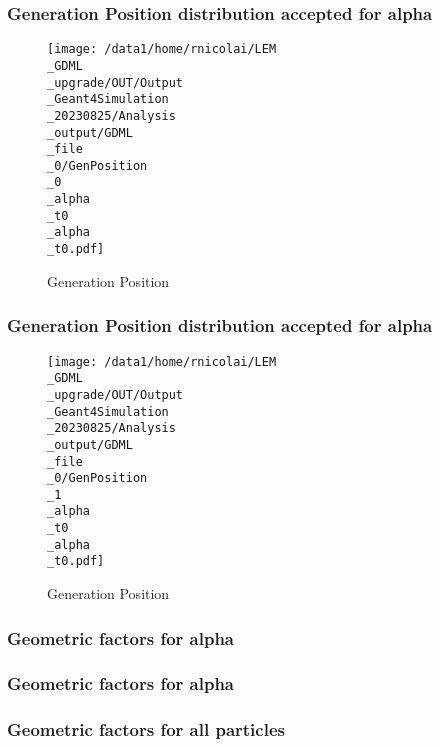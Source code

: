 \documentclass[8pt]{beamer}
\begin{document}
            \begin{frame}
                \frametitle{Generation Position distribution accepted for alpha}
            
        \begin{figure}[h]
            \centering
            \texttt{[image: /data1/home/rnicolai/LEM\\\_GDML\\\_upgrade/OUT/Output\\\_Geant4Simulation\\\_20230825/Analysis\\\_output/GDML\\\_file\\\_0/GenPosition\\\_0\\\_alpha\\\_t0\\\_alpha\\\_t0.pdf]}
            \caption{Generation Position}
        \end{figure}
        
            \end{frame}
            
            \begin{frame}
                \frametitle{Generation Position distribution accepted for alpha}
            
        \begin{figure}[h]
            \centering
            \texttt{[image: /data1/home/rnicolai/LEM\\\_GDML\\\_upgrade/OUT/Output\\\_Geant4Simulation\\\_20230825/Analysis\\\_output/GDML\\\_file\\\_0/GenPosition\\\_1\\\_alpha\\\_t0\\\_alpha\\\_t0.pdf]}
            \caption{Generation Position}
        \end{figure}
        
            \end{frame}
            
            \begin{frame}
                \frametitle{Geometric factors for alpha}
            
            \end{frame}
            
            \begin{frame}
                \frametitle{Geometric factors for alpha}
            
            \end{frame}
            
            \begin{frame}
                \frametitle{Geometric factors for all particles}
            
            \end{frame}
            
        
\end{document}
